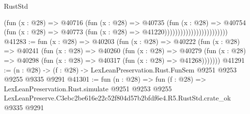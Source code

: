 \begin{lexlean}{RustStd}
\begin{coremodule}
                                          (fun (x : @28) =>
                                          @40716
                                            (fun (x : @28) =>
                                            @40735
                                              (fun (x : @28) =>
                                              @40754
                                                (fun (x : @28) =>
                                                @40773
                                                  (fun (x : @28) => @41220))))))))))))))))))))))))
@41283 := fun (x : @28) =>
  @40203
    (fun (x : @28) =>
    @40222
      (fun (x : @28) =>
      @40241
        (fun (x : @28) =>
        @40260
          (fun (x : @28) =>
          @40279 (fun (x : @28) => @40298 (fun (x : @28) => @40317 (fun (x : @28) => @41268)))))))
@41291 := (n : @28) -> (f : @28) -> LexLeanPreservation.Rust.FunSem @9251 @9253 @9255 @9335 @9291
@41301 := fun (n : @28) =>
  fun (f : @28) =>
  LexLeanPreservation.Rust.simulate
    @9251
    @9253
    @9255
    LexLeanPreserve.C3ebc2be616e22c52f804d57b2bfdf6e4.R5.RustStd.crate_ok
    @9335
    @9291
\end{coremodule}
\end{lexlean}
